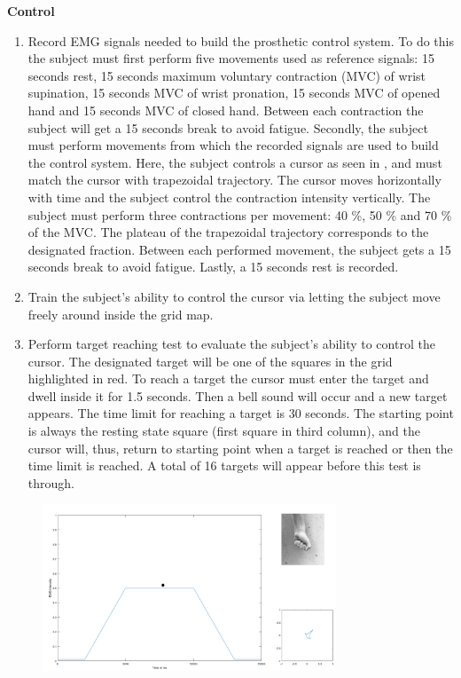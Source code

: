 \textbf{{Control}} \\
\begin{enumerate}
	\item Record EMG signals needed to build the prosthetic control system. To do this the subject must first perform  five movements used as reference signals: 15 seconds rest, 15 seconds maximum voluntary contraction (MVC) of wrist supination, 15 seconds MVC of wrist pronation, 15 seconds MVC of opened hand and 15 seconds MVC of closed hand. Between each contraction the subject will get a 15 seconds break to avoid fatigue. Secondly, the subject must perform movements from which the recorded signals are used to build the control system. Here, the subject controls a cursor as seen in , and must match the cursor with trapezoidal trajectory. The cursor moves horizontally with time and the subject control the contraction intensity vertically. The subject must perform three contractions per movement: 40 \%, 50 \% and 70 \% of the MVC. The plateau of the trapezoidal trajectory corresponds to the designated fraction. Between each performed movement, the subject gets a 15 seconds break to avoid fatigue. Lastly, a 15 seconds rest is recorded. 
	\item Train the subject's ability to control the cursor via letting the subject move freely around inside the grid map.
	\item Perform target reaching test to evaluate the subject's ability to control the cursor. The designated target will be one of the squares in the grid highlighted in red. To reach a target the cursor must enter the target and dwell inside it for 1.5 seconds. Then a bell sound will occur and a new target appears. The time limit for reaching a target is 30 seconds. The starting point is always the resting state square (first square in third column), and the cursor will, thus, return to starting point when a target is reached or then the time limit is reached. A total of 16 targets will appear before this test is through.
\end{enumerate}

\begin{figure}[H]                 
	\includegraphics[width=0.78\textwidth]{figures/trapezoid}  
	\caption{}
	\label{fig:trapezoid} 
\end{figure}

